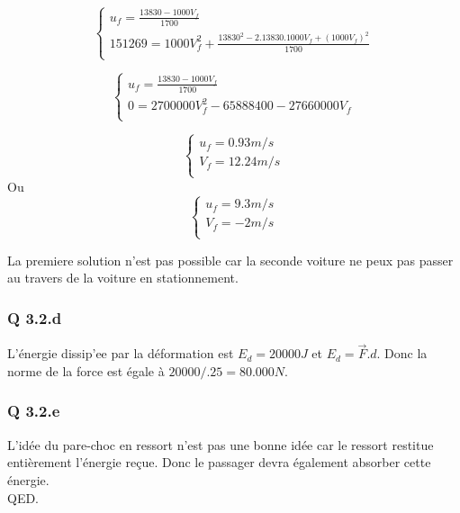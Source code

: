 \documentclass[]{book}
\theoremstyle{definition}
\begin{document}
$$
\left\{ 
\begin{array}{l}
 u_f = \frac{13830 - 1000V_f}{1700}\\
 151269  = 1000V_f^2 + \frac{13830^2 - 2.13830.1000V_f + (1000V_f)^2}{1700}\\
\end{array}
\right. 
$$

$$
\left\{ 
\begin{array}{l}
 u_f = \frac{13830 - 1000V_f}{1700}\\
 0 = 2700000V_f^2 -65888400 - 27660000V_f \\
\end{array}
\right. 
$$

$$
\left\{ 
\begin{array}{l}
 u_f = 0.93m/s\\
 V_f = 12.24m/s \\
\end{array}
\right. 
$$
Ou
$$
\left\{ 
\begin{array}{l}
 u_f = 9.3m/s\\
 V_f = -2m/s \\
\end{array}
\right. 
$$

La premiere solution n'est pas possible car la seconde voiture ne peux pas passer au travers de la voiture en stationnement.

\subsubsection*{Q 3.2.d}
L'\'energie dissip'ee par la d\'eformation est $E_d = 20000J$ et $E_d = \overrightarrow{F}.d$. Donc la norme de la force est \'egale \`a $20000/.25 = 80.000N$.

\subsubsection*{Q 3.2.e}
 L'id\'ee du pare-choc en ressort n'est pas une bonne id\'ee car le ressort restitue enti\`erement l'\'energie re\c{c}ue. Donc le passager devra \'egalement absorber cette \'energie.\\
 
 
 
QED.
\end{document}
